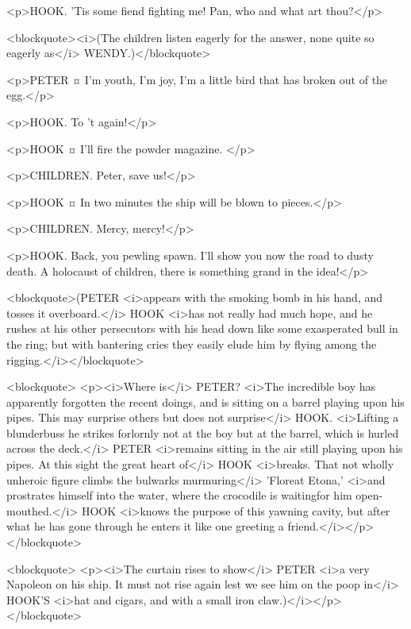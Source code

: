 <p>HOOK. 'Tis some fiend fighting me! Pan, who and what art thou?</p>

<blockquote><i>(The children listen eagerly for the answer, none quite so eagerly as</i> WENDY.)</blockquote>

<p>PETER ¤
I'm youth, I'm joy, I'm a little bird that has broken out of the egg.</p>

<p>HOOK. To 't again!</p>


<p>HOOK ¤
I'll fire the powder magazine.
</p>

<p>CHILDREN. Peter, save us!</p>


<p>HOOK ¤
In two minutes the ship will be blown to pieces.</p>


<p>CHILDREN. Mercy, mercy!</p>

<p>HOOK. Back, you pewling spawn. I'll show you now the road to dusty death. A holocaust of children, there is something grand in the idea!</p>

<blockquote>(PETER <i>appears with the smoking bomb in his hand, and tosses it overboard.</i> HOOK <i>has not really had much hope, and he rushes at his other persecutors with his head down like some exasperated bull in the ring; but with bantering cries they easily elude him by flying among the rigging.</i></blockquote>

<blockquote> <p><i>Where is</i> PETER? <i>The incredible boy has apparently forgotten the recent doings, and is sitting on a barrel playing upon his pipes. This may surprise others but does not surprise</i> HOOK. <i>Lifting a blunderbuss he strikes forlornly not at the boy but at the barrel, which is hurled across the deck.</i> PETER <i>remains sitting in the air still playing upon his pipes. At this sight the great heart of</i> HOOK <i>breaks. That not wholly unheroic figure climbs the bulwarks murmuring</i> 'Floreat Etona,' <i>and prostrates himself into the water, where the crocodile is waitingfor him open-mouthed.</i> HOOK <i>knows the purpose of this yawning cavity, but after what he has gone through he enters it like one greeting a friend.</i></p> </blockquote>

<blockquote> <p><i>The curtain rises to show</i> PETER <i>a very Napoleon on his ship. It must not rise again lest we see him on the poop in</i> HOOK'S <i>hat and cigars, and with a small iron claw.)</i></p> </blockquote>
